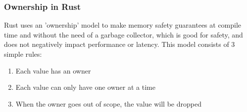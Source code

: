 \subsubsection{Ownership in Rust}

Rust uses an 'ownership' model \cite{rust_ownership} to make memory safety guarantees at compile time and without the need of a garbage collector,
which is good for safety, and does not negatively impact performance or latency.
This model consists of 3 simple rules:
\begin{enumerate}
    \item Each value has an owner
    \item Each value can only have one owner at a time
    \item When the owner goes out of scope, the value will be dropped
\end{enumerate}

